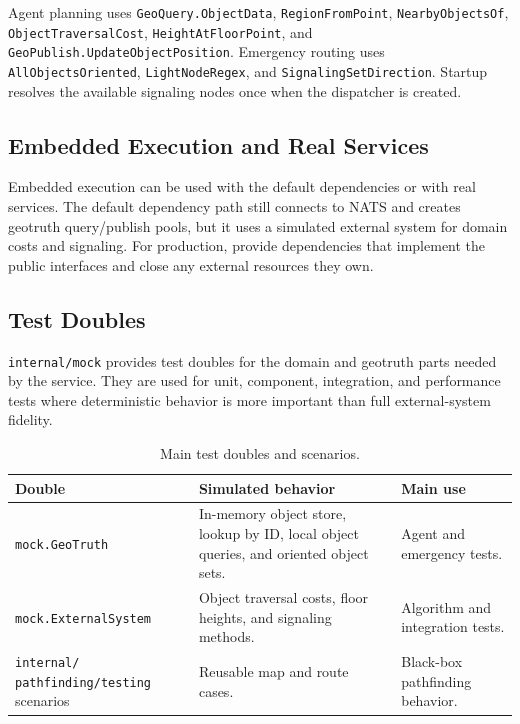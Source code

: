 \documentclass[12pt,a4paper]{report}
\begin{document}
Agent planning uses \texttt{GeoQuery.ObjectData}, \texttt{RegionFromPoint},
\texttt{NearbyObjectsOf}, \newline \texttt{ObjectTraversalCost},
\texttt{HeightAtFloorPoint}, and \texttt{GeoPublish.UpdateObjectPosition}.
Emergency routing uses \texttt{AllObjectsOriented}, \texttt{LightNodeRegex}, and
\newline \texttt{SignalingSetDirection}. Startup resolves the available signaling nodes
once when the dispatcher is created.

\subsection{Embedded Execution and Real Services}

Embedded execution can be used with the default dependencies or with real
services. The default dependency path still connects to NATS and creates
geotruth query/publish pools, but it uses a simulated external system for domain
costs and signaling. For production, provide dependencies that implement the
public interfaces and close any external resources they own.

\subsection{Test Doubles}

\texttt{internal/mock} provides test doubles for the domain and geotruth parts
needed by the service. They are used for unit, component, integration, and
performance tests where deterministic behavior is more important than full
external-system fidelity.

\begin{table}[H]
\centering
\begin{tabular}{|p{}|p{}|p{}|}
\hline
\textbf{Double} & \textbf{Simulated behavior} & \textbf{Main use} \\
\hline
\texttt{mock.GeoTruth} &
In-memory object store, lookup by ID, local object queries, and oriented object
sets. &
Agent and emergency tests. \\
\hline
\texttt{mock.ExternalSystem} &
Object traversal costs, floor heights, and signaling methods. &
Algorithm and integration tests. \\
\hline
\texttt{internal/} \newline \texttt{pathfinding/testing} scenarios &
Reusable map and route cases. &
Black-box pathfinding behavior. \\
\hline
\end{tabular}
\caption{Main test doubles and scenarios.}
\end{table}
\end{document}
